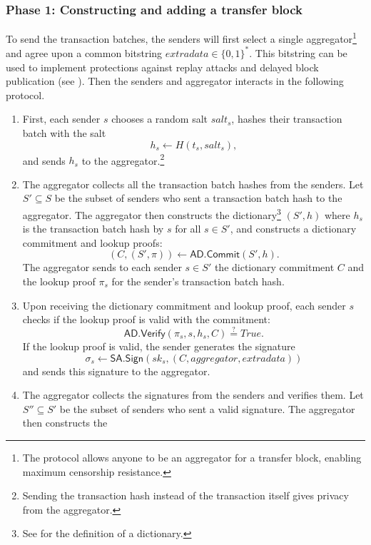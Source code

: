 \subsubsection{Phase 1: Constructing and adding a transfer
block}\label{section:transferring-phase-1}

To send the transaction batches, the senders will first select a
single aggregator\footnote{The protocol allows anyone to be an
  aggregator for a transfer block, enabling maximum censorship
resistance.} and agree upon a common bitstring \(extradata \in
\{0,1\}^*\). This bitstring can be used to implement protections
against replay attacks and delayed block publication (see
). Then the senders and aggregator interacts
in the following protocol.

\begin{enumerate}
  \item First, each sender \(s\) chooses a random salt \(salt_s\),
    hashes their transaction batch with the salt \[h_s \leftarrow
    H(t_s,salt_s),\] and sends \(h_s\) to the
    aggregator.\footnote{Sending the transaction hash instead of the
    transaction itself gives privacy from the aggregator.}
  \item The aggregator collects all the transaction batch hashes from
    the senders. Let \(S' \subseteq S\) be the subset of senders who
    sent a transaction batch hash to the aggregator. The aggregator
    then constructs the dictionary\footnote{See
     for the definition of a dictionary.}
    \((S',h)\) where \(h_s\) is the transaction batch hash by \(s\)
    for all \(s \in S'\), and constructs a dictionary commitment and
    lookup proofs: \[(C, (S',\pi)) \leftarrow
    \mathsf{AD.Commit}(S',h).\] The aggregator sends to each sender
    \(s \in S'\) the dictionary commitment \(C\) and the lookup proof
    \(\pi_s\) for the sender's transaction batch hash.
  \item Upon receiving the dictionary commitment and lookup proof,
    each sender \(s\) checks if the lookup proof is valid with the
    commitment: \[\mathsf{AD.Verify}(\pi_s,s,h_s,C) \stackrel{?}{=}
    True.\] If the lookup proof is valid, the sender generates the
    signature \[\sigma_s \leftarrow
    \mathsf{SA.Sign}(sk_s,(C,aggregator,extradata))\] and sends this
    signature to the aggregator.
  \item The aggregator collects the signatures from the senders and
    verifies them. Let \(S'' \subseteq S'\) be the subset of senders
    who sent a valid signature. The aggregator then constructs the

\end{enumerate}
